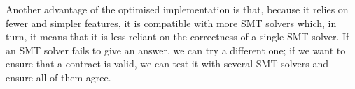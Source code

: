 \documentclass[english,runningheads]{llncs}
\begin{document}
Another advantage of the optimised implementation is that, because
it relies on fewer and simpler features, it is compatible with more
SMT solvers which, in turn, it means that it is less reliant on the
correctness of a single SMT solver. If an SMT solver fails to give
an answer, we can try a different one; if we want to ensure that a
contract is valid, we can test it with several SMT solvers and ensure
all of them agree. 



\end{document}

